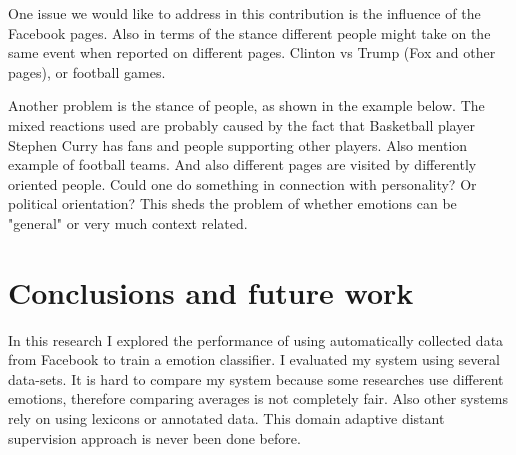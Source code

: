 \documentclass[11pt]{article}
\begin{document}
%

One issue we would like to address in this contribution is the influence of the Facebook pages. Also in terms of the stance different people might take on the same event when reported on different pages. Clinton vs Trump (Fox and other pages), or football games.


Another problem is the stance of people, as shown in the example below. The mixed reactions used are probably caused by the fact that Basketball player Stephen Curry has fans and people supporting other players. Also mention example of football teams. And also different pages are visited by differently oriented people. Could one do something in connection with personality? Or political orientation? This sheds the problem of whether emotions can be "general" or very much context related.
%
%
%






\section{Conclusions and future work}
\label{sec:conclusions}
In this research I explored the performance of using automatically collected data from Facebook to train a emotion classifier. I evaluated my system using several data-sets. It is hard to compare my system because some researches use different emotions, therefore comparing averages is not completely fair. Also other systems rely on using lexicons or annotated data. This domain adaptive distant supervision approach is never been done before.
\end{document}

